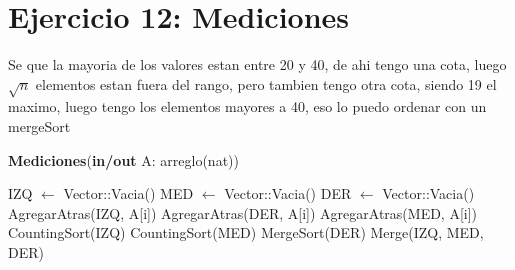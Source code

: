 \section{Ejercicio 12: Mediciones}
Se que la mayoria de los valores estan entre 20 y 40, de ahi tengo una cota, luego $\sqrt{n}$ elementos estan fuera del rango, pero tambien tengo otra cota, siendo 19 el maximo, luego tengo los elementos mayores a 40, eso lo puedo ordenar con un mergeSort

\begin{algorithm}[H]
\caption{
    \textbf{Mediciones}(\textbf{in/out} A: arreglo(nat))
}
    \begin{algorithmic}[1]
        \State IZQ $\gets$ Vector::Vacia() 
        \State MED $\gets$ Vector::Vacia() 
        \State DER $\gets$ Vector::Vacia() 
         
                \State AgregarAtras(IZQ, A[i])
                \State AgregarAtras(DER, A[i])
            \Else
                \State AgregarAtras(MED, A[i])
            \EndIf
        \EndFor
        \State CountingSort(IZQ) 
        \State CountingSort(MED) 
        \State MergeSort(DER) 
        \State Merge(IZQ, MED, DER) 
    \end{algorithmic}
\end{algorithm}